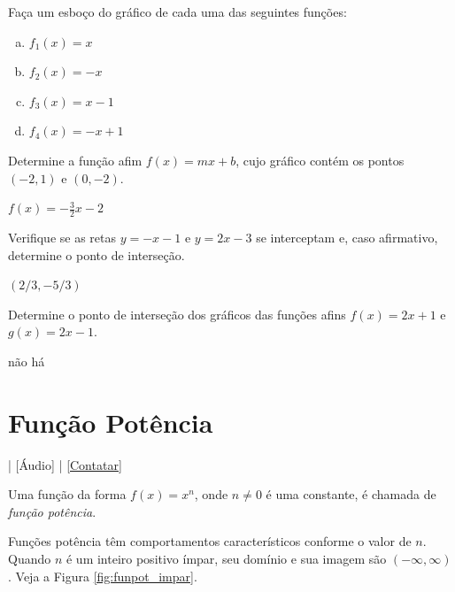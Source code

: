 \begin{exer}
  Faça um esboço do gráfico de cada uma das seguintes funções:
  \begin{enumerate}[a)]
  \item $f_1(x) = x$
  \item $f_2(x) = -x$
  \item $f_3(x) = x-1$
  \item $f_4(x) = -x+1$
  \end{enumerate}
\end{exer}

\begin{exer}
  Determine a função afim $f(x)=mx+b$, cujo gráfico contém os pontos $(-2, 1)$ e $(0, -2)$.
\end{exer}
\begin{resp}
  $f(x) = -\frac{3}{2}x - 2$
\end{resp}

\begin{exer}
  Verifique se as retas $y = -x - 1$ e $y = 2x - 3$ se interceptam e, caso afirmativo, determine o ponto de interseção.
\end{exer}
\begin{resp}
  $(2/3,-5/3)$
\end{resp}

\begin{exer}
  Determine o ponto de interseção dos gráficos das funções afins $f(x) = 2x + 1$ e $g(x) = 2x -1$.
\end{exer}
\begin{resp}
  não há
\end{resp}



\section{Função Potência}\label{cap_funcao_sec_funpot}

\begin{flushright}
  [Vídeo] | [Áudio] | \href{https://phkonzen.github.io/notas/contato.html}{[Contatar]}
\end{flushright}

Uma função da forma $f(x)=x^n$, onde $n\neq 0$ é uma constante, é chamada de \emph{função potência}.

Funções potência têm comportamentos característicos conforme o valor de $n$. Quando $n$ é um inteiro positivo ímpar, seu domínio e sua imagem são $(-\infty, \infty)$. Veja a Figura \ref{fig:funpot_impar}.


